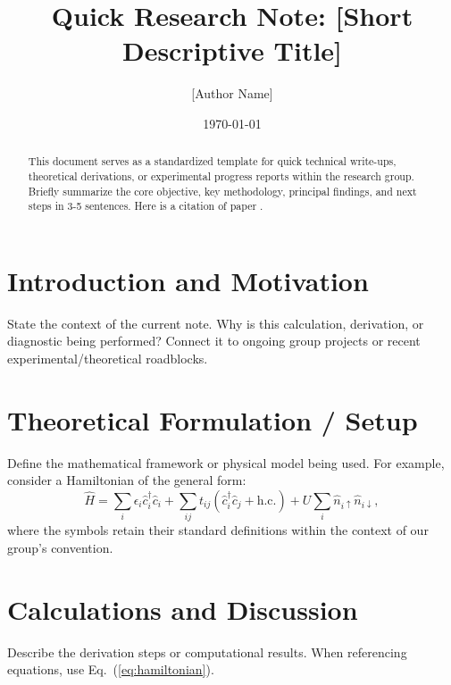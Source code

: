 \documentclass[
    reprint,
    aps,
    pra,
    amsmath,
    amssymb,
    superscriptaddress,
    onecolumn,
    11pt
]{revtex4-2}
\begin{document}
\title{Quick Research Note: [Short Descriptive Title]}

\author{[Author Name]}
%

\date{\today}

\begin{abstract}
  This document serves as a standardized template for quick technical write-ups, theoretical derivations, or experimental progress reports within the research group. Briefly summarize the core objective, key methodology, principal findings, and next steps in 3-5 sentences. Here is a citation of paper \cite{johndoe2024}.
\end{abstract}

\maketitle

\section{\label{sec:intro}Introduction and Motivation}
State the context of the current note. Why is this calculation, derivation, or diagnostic being performed? Connect it to ongoing group projects or recent experimental/theoretical roadblocks.

\section{\label{sec:formulation}Theoretical Formulation / Setup}
Define the mathematical framework or physical model being used. For example, consider a Hamiltonian of the general form:
\begin{equation}
    \hat{H} = \sum_{i} \epsilon_i \hat{c}^\dagger_i \hat{c}_i + \sum_{ij} t_{ij} \left( \hat{c}^\dagger_i \hat{c}_j + \text{h.c.} \right) + U \sum_i \hat{n}_{i\uparrow} \hat{n}_{i\downarrow},
    \label{eq:hamiltonian}
\end{equation}
where the symbols retain their standard definitions within the context of our group's convention.

\section{\label{sec:results}Calculations and Discussion}
Describe the derivation steps or computational results. When referencing equations, use Eq.~(\ref{eq:hamiltonian}).
\end{document}
